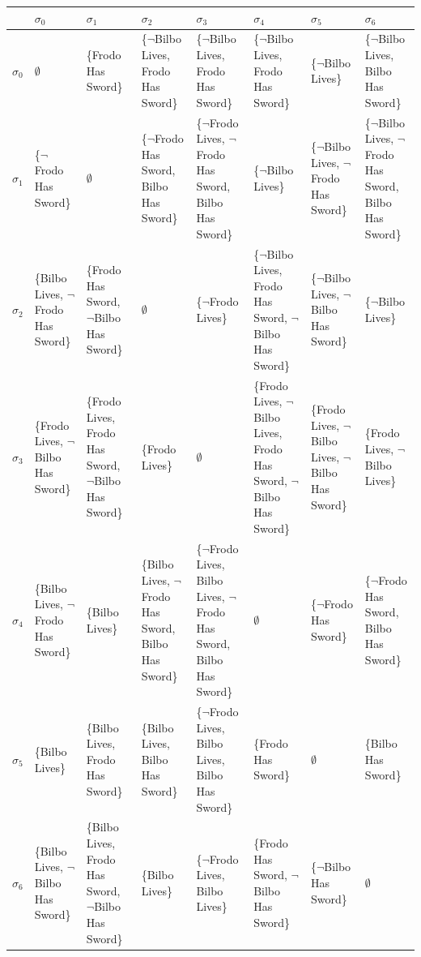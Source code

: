 \documentclass[11pt,a4paper]{article}
\begin{document}
\begin{table}[]
	\centering
	\label{my-label}
	\caption{Różnice między stanami}
\begin{longtable}{|p{1cm}|p{1.9cm}|p{1.9cm}|p{1.9cm}|p{1.9cm}|p{1.9cm}|p{1.9cm}|p{1.9cm}|}
\hline
     & $\sigma_0$  & $\sigma_1$ & $\sigma_2$ & $\sigma_3$ & $\sigma_4$ & $\sigma_5$ & $\sigma_6$ \\ \hline
	 $\sigma_0$ & $\emptyset$  & \{Frodo Has Sword\} & \{$\neg$Bilbo Lives, Frodo Has Sword\} & \{$\neg$Bilbo Lives, Frodo Has Sword\} & \{$\neg$Bilbo Lives, Frodo Has Sword\} & \{$\neg$Bilbo Lives\} & \{$\neg$Bilbo Lives, Bilbo Has Sword\} \\ \hline
	 
     $\sigma_1$ &  \{$\neg$Frodo Has Sword\} & $\emptyset$ & \{$\neg$Frodo Has Sword, Bilbo Has Sword\}  & \{$\neg$Frodo Lives, $\neg$Frodo Has Sword, Bilbo Has Sword\}  & \{$\neg$Bilbo Lives\} & \{$\neg$Bilbo Lives, $\neg$Frodo  Has Sword\} & \{$\neg$Bilbo Lives, $\neg$Frodo Has Sword, Bilbo Has Sword\}\\ \hline
     
     $\sigma_2$ &  \{Bilbo Lives, $\neg$Frodo Has Sword\}  & \{Frodo Has Sword, $\neg$Bilbo Has Sword\} & $\emptyset$ & \{$\neg$Frodo Lives\} & \{$\neg$Bilbo Lives, Frodo Has Sword, $\neg$Bilbo Has Sword\} & \{$\neg$Bilbo Lives, $\neg$Bilbo Has Sword\} & \{$\neg$Bilbo Lives\}\\ \hline
     
     $\sigma_3$ &  \{Frodo Lives, $\neg$Bilbo Has Sword\}  & \{Frodo Lives, Frodo Has Sword, $\neg$Bilbo Has Sword\} & \{Frodo Lives\} &  $\emptyset$ & \{Frodo Lives, $\neg$Bilbo Lives, Frodo Has Sword, $\neg$Bilbo Has Sword\} & \{Frodo Lives, $\neg$Bilbo Lives, $\neg$Bilbo Has Sword\} & \{Frodo Lives, $\neg$Bilbo Lives\} \\ \hline
     
     $\sigma_4$ &  \{Bilbo Lives, $\neg$Frodo Has Sword\}  & \{Bilbo Lives\} & \{Bilbo Lives, $\neg$Frodo Has Sword, Bilbo Has Sword\} & \{$\neg$Frodo Lives, Bilbo Lives, $\neg$Frodo Has Sword, Bilbo Has Sword\} & $\emptyset$ &\{$\neg$Frodo Has Sword\} & \{$\neg$Frodo Has Sword, Bilbo Has Sword\}  \\ \hline
     
     $\sigma_5$ &  \{Bilbo Lives\}  & \{Bilbo Lives, Frodo Has Sword\} & \{Bilbo Lives, Bilbo Has Sword\} & \{$\neg$Frodo Lives, Bilbo Lives, Bilbo Has Sword\} & \{Frodo Has Sword\} & $\emptyset$ & \{Bilbo Has Sword\} \\ \hline
     
     $\sigma_6$ &  \{Bilbo Lives, $\neg$Bilbo Has Sword\} & \{Bilbo Lives, Frodo Has Sword, $\neg$Bilbo Has Sword\} & \{Bilbo Lives\} & \{$\neg$Frodo Lives, Bilbo Lives\} & \{Frodo Has Sword, $\neg$Bilbo Has Sword\} & \{$\neg$Bilbo Has Sword\} & $\emptyset$\\ \hline
\end{longtable}
\end{table}
 
\end{document}
